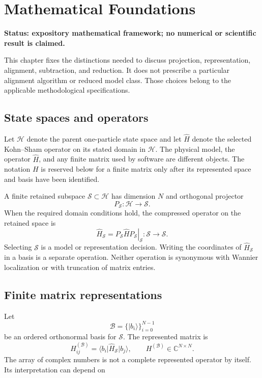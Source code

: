 \chapter{Mathematical Foundations}
\label{ch:mathematical-foundations}

\textbf{Status: expository mathematical framework; no numerical or scientific
result is claimed.}

This chapter fixes the distinctions needed to discuss projection,
representation, alignment, subtraction, and reduction. It does not prescribe a
particular alignment algorithm or reduced model class. Those choices belong to
the applicable methodological specifications.

\section{State spaces and operators}

Let $\mathcal H$ denote the parent one-particle state space and let
$\widehat H$ denote the selected Kohn--Sham operator on its stated domain in
$\mathcal H$. The physical model, the operator $\widehat H$, and any finite
matrix used by software are different objects. The notation $H$ is reserved
below for a finite matrix only after its represented space and basis have been
identified.

A finite retained subspace $\mathcal S\subset\mathcal H$ has dimension $N$ and
orthogonal projector
\begin{equation}
  P_{\mathcal S}:\mathcal H\longrightarrow\mathcal S.
\end{equation}
When the required domain conditions hold, the compressed operator on the
retained space is
\begin{equation}
  \widehat H_{\mathcal S}
  =
  \left.P_{\mathcal S}\widehat H P_{\mathcal S}\right|_{\mathcal S}
  :\mathcal S\longrightarrow\mathcal S.
\end{equation}
Selecting $\mathcal S$ is a model or representation decision. Writing the
coordinates of $\widehat H_{\mathcal S}$ in a basis is a separate operation.
Neither operation is synonymous with Wannier localization or with truncation of
matrix entries.

\section{Finite matrix representations}

Let
\begin{equation}
  \mathcal B=\{\lvert b_i\rangle\}_{i=0}^{N-1}
\end{equation}
be an ordered orthonormal basis for $\mathcal S$. The represented matrix is
\begin{equation}
  H^{(\mathcal B)}_{ij}
  =
  \langle b_i\lvert\widehat H_{\mathcal S}\rvert b_j\rangle,
  \qquad
  H^{(\mathcal B)}\in\mathbb C^{N\times N}.
\end{equation}
The array of complex numbers is not a complete represented operator by itself.
Its interpretation can depend on

